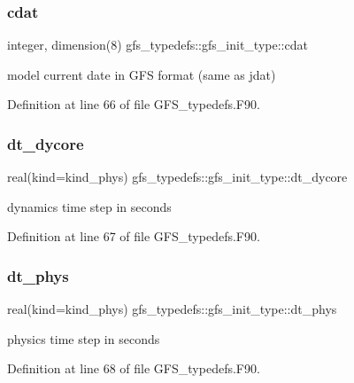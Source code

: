 \subsubsection{cdat}
{\footnotesize\ttfamily integer, dimension(8) gfs\+\_\+typedefs\+::gfs\+\_\+init\+\_\+type\+::cdat}



model current date in G\+FS format (same as jdat) 



Definition at line 66 of file G\+F\+S\+\_\+typedefs.\+F90.

\mbox{\label{structgfs__typedefs_1_1gfs__init__type_adf0b3a0475fe8e9db1d734c6f129b84a}} 
\subsubsection{dt\+\_\+dycore}
{\footnotesize\ttfamily real(kind=kind\+\_\+phys) gfs\+\_\+typedefs\+::gfs\+\_\+init\+\_\+type\+::dt\+\_\+dycore}



dynamics time step in seconds 



Definition at line 67 of file G\+F\+S\+\_\+typedefs.\+F90.

\mbox{\label{structgfs__typedefs_1_1gfs__init__type_a988e155b5aef17af3a747b53cdc2e65c}} 
\subsubsection{dt\+\_\+phys}
{\footnotesize\ttfamily real(kind=kind\+\_\+phys) gfs\+\_\+typedefs\+::gfs\+\_\+init\+\_\+type\+::dt\+\_\+phys}



physics time step in seconds 



Definition at line 68 of file G\+F\+S\+\_\+typedefs.\+F90.

\mbox{\label{structgfs__typedefs_1_1gfs__init__type_ab75da119a35eb92cadf2621a761393cc}} 
